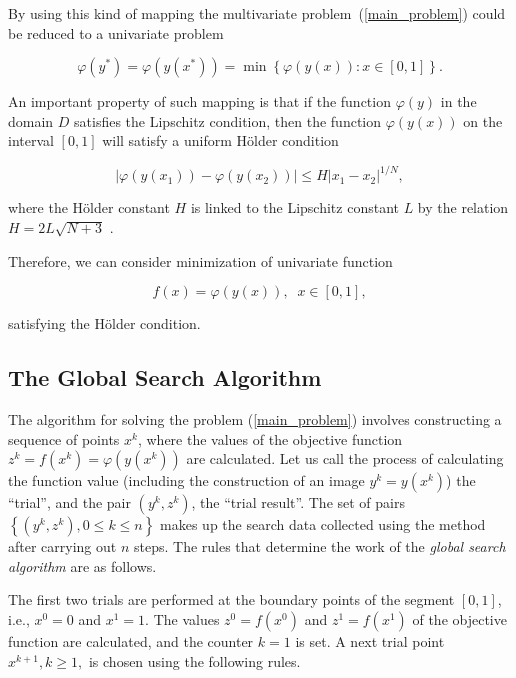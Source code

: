 \documentclass[mathematics,article,submit,pdftex,moreauthors]{Definitions/mdpi}
\begin{document}
By using this kind of mapping the multivariate problem~(\ref{main_problem}) could be reduced to a univariate problem
\begin{linenomath}
\begin{equation}
\varphi(y^\ast)=\varphi(y(x^\ast))=\min{\left\{\varphi(y(x)): x\in[0,1]\right\}}.
\end{equation}
\end{linenomath}

An important property of such mapping is that if the function $\varphi(y)$ in the domain $D$ satisfies the Lipschitz condition, then the function $\varphi(y(x))$ on the interval $[0,1]$ will satisfy a uniform H{\"o}lder condition
\begin{linenomath}
\begin{equation}
\left|\varphi(y(x_1))-\varphi(y(x_2))\right|\leq H\left|x_1-x_2\right|^{1/N},
\end{equation}
\end{linenomath}
where the H{\"o}lder constant $H$ is linked to the Lipschitz constant $L$ by the relation $H=2L\sqrt{N+3}$ \cite{Strongin2000}.

Therefore, we can consider minimization of univariate function
\begin{linenomath}
\begin{equation}
f(x)=\varphi(y(x)), \;\; x\in[0,1],
\end{equation}
\end{linenomath}
satisfying the H{\"o}lder condition.


\subsection{The Global Search Algorithm}\label{GSA}

The algorithm for solving the problem (\ref{main_problem}) involves constructing a sequence of points $x^k$, where the values of the objective function $z^k = f(x^k)=\varphi(y(x^k))$ are calculated. Let us call the process of calculating the function value (including the construction of an image $y^k=y(x^k)$) the ``trial'', and the pair $(y^k, z^k)$, the ``trial result''. The set of pairs $\left\{(y^k, z^k), 0\leq k\leq n\right\}$ makes up the search data collected using the method after carrying out $n$ steps. The rules that determine the work of the \textit{global search algorithm} are as follows.

The first two trials are performed at the boundary points of the segment $[0,1]$, i.e., $x^0 = 0$ and $x^1 = 1$. The values $z^0 = f(x^0)$ and $z^1 = f(x^1)$ of the objective function are calculated, and the counter $k = 1$ is set. A next trial point $x^{k+1}, k \geq 1,$ is chosen using the following rules.
\end{document}

